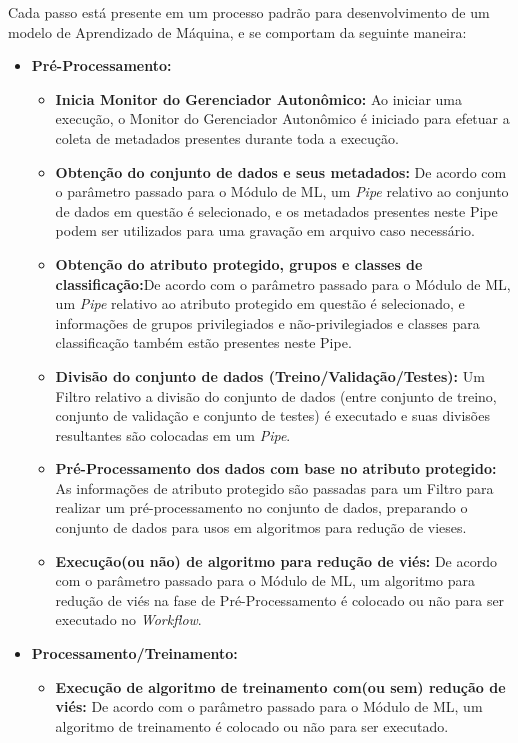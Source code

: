 \documentclass[portugues]{ic-tese}
\begin{document}
Cada passo está presente em um processo padrão para desenvolvimento de um modelo de Aprendizado de Máquina, e se comportam da seguinte maneira:

\begin{itemize}
\item \textbf{Pré-Processamento:}
	\begin{itemize}
	\item \textbf{Inicia Monitor do Gerenciador Autonômico:} Ao iniciar uma execução, o Monitor do Gerenciador Autonômico é iniciado para efetuar a coleta de metadados presentes durante toda a execução.
	\item \textbf{Obtenção do conjunto de dados e seus metadados:} De acordo com o parâmetro passado para o Módulo de ML, um \textit{Pipe} relativo ao conjunto de dados em questão é selecionado, e os metadados presentes neste Pipe podem ser utilizados para uma gravação em arquivo caso necessário.
	\item \textbf{Obtenção do atributo protegido, grupos e classes de classificação:}De acordo com o parâmetro passado para o Módulo de ML, um \textit{Pipe} relativo ao atributo protegido em questão é selecionado, e informações de grupos privilegiados e não-privilegiados e classes para classificação também estão presentes neste Pipe.
	\item \textbf{Divisão do conjunto de dados (Treino/Validação/Testes):} Um Filtro relativo a divisão do conjunto de dados (entre conjunto de treino, conjunto de validação e conjunto de testes) é executado e suas divisões resultantes são colocadas em um \textit{Pipe}.
	\item \textbf{Pré-Processamento dos dados com base no atributo protegido:} As informações de atributo protegido são passadas para um Filtro para realizar um pré-processamento no conjunto de dados, preparando o conjunto de dados para usos em algoritmos para redução de vieses.
	\item \textbf{Execução(ou não) de algoritmo para redução de viés:} De acordo com o parâmetro passado para o Módulo de ML, um algoritmo para redução de viés na fase de Pré-Processamento é colocado ou não para ser executado no \textit{Workflow}. 
	\end{itemize}
\item \textbf{Processamento/Treinamento:}
	\begin{itemize}
	\item \textbf{Execução de algoritmo de treinamento com(ou sem) redução de viés:} De acordo com o parâmetro passado para o Módulo de ML, um algoritmo de treinamento é colocado ou não para ser executado.

\end{itemize}
\end{itemize}
\end{document}
